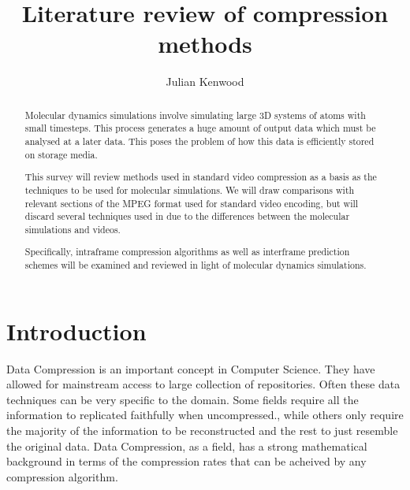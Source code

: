 \documentclass[twocolumn, a4paper,10pt]{article}
\title{Literature review of compression methods}
\author{Julian Kenwood}
\begin{document}
\maketitle

\begin{abstract} %

Molecular dynamics simulations involve simulating large 3D systems of atoms with small timesteps. This process generates a huge amount of output data which must be analysed at a later data. This poses the problem of how this data is efficiently stored on storage media.

This survey will review methods used in standard video compression as a basis as the techniques to be used for molecular simulations. We will draw comparisons with relevant sections of the MPEG format used for standard video encoding, but will discard several techniques used in due to the differences between the molecular simulations and videos.

Specifically, intraframe compression algorithms as well as interframe prediction schemes will be examined and reviewed in light of molecular dynamics simulations. 


% 

\end{abstract}

% 
% 

\section*{Introduction} %

Data Compression is an important concept in Computer Science. They have allowed for mainstream access to large collection of repositories. Often these data techniques can be very specific to the domain. Some fields require all the information to replicated faithfully when uncompressed., while others only require the majority of the information to be reconstructed and the rest to just resemble the original data. Data Compression, as a field, has a strong mathematical background in terms of the compression rates that can be acheived by any compression algorithm. 
\end{document}
